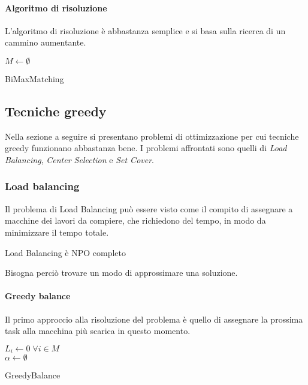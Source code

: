 \paragraph{Algoritmo di risoluzione}
L'algoritmo di risoluzione è abbastanza semplice e si basa sulla 
ricerca di un cammino aumentante.

\begin{algorithm}[H]
    \SetAlgoLined
     $M \gets \emptyset$\\
     \caption{BiMaxMatching}
\end{algorithm}


\subsection{Tecniche greedy}
Nella sezione a seguire si presentano problemi di ottimizzazione per cui 
tecniche greedy funzionano abbastanza bene. 
I problemi affrontati sono quelli di \emph{Load Balancing}, \emph{Center Selection} e \emph{Set Cover}.

\subsubsection{Load balancing}
\label{lb}
Il problema di Load Balancing può essere visto come il compito
di assegnare a macchine dei lavori da compiere, che richiedono del tempo, 
in modo da minimizzare il tempo totale.


\begin{theorem}
    Load Balancing è NPO completo
\end{theorem}
Bisogna perciò trovare un modo di approssimare una soluzione.
\paragraph{Greedy balance}
Il primo approccio alla risoluzione del problema è quello di assegnare la prossima
task alla macchina più scarica in questo momento.

\begin{algorithm}[H]
    \SetAlgoLined
     $L_i \gets 0\;\forall i \in M$\\
     $\alpha \gets \emptyset$\\
     \Return{$\alpha$}
     \caption{GreedyBalance}
\end{algorithm}


